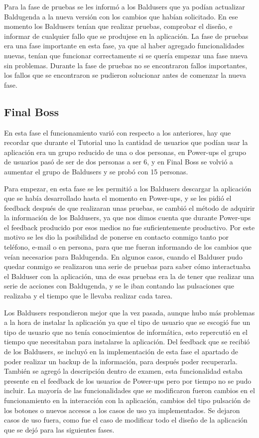 Para la fase de pruebas se les informó a los Baldusers que ya podían actualizar Baldugenda a la nueva versión con los cambios que habían solicitado. En ese momento los Baldusers tenían que realizar pruebas, comprobar el diseño, e informar de  cualquier fallo que se produjese en la aplicación. La fase de pruebas era una fase importante en esta fase, ya que al haber agregado funcionalidades nuevas, tenían que funcionar correctamente si se quería empezar una fase nueva sin problemas. Durante la fase de pruebas no se encontraron fallos importantes, los fallos que se encontraron se pudieron solucionar antes de comenzar la nueva fase.

\subsection{Final Boss}
\label{subsecc:final boss}

En esta fase el funcionamiento varió con respecto a los anteriores, hay que recordar que durante el Tutorial uno la cantidad de usuarios que podían usar la aplicación era un grupo reducido de una o dos personas, en Power-ups el grupo de usuarios pasó de ser de dos personas a ser 6, y en Final Boss se volvió a aumentar el grupo de Baldusers y se probó con 15 personas.

Para empezar, en esta fase se les permitió a los Baldusers descargar la aplicación que se había desarrollado hasta el momento en Power-ups, y se les pidió el feedback después de que realizaran unas pruebas, se cambió el método de adquirir la información de los Baldusers, ya que nos dimos cuenta que durante Power-ups el feedback producido por esos medios no fue suficientemente productivo. Por este motivo se les dio la posibilidad de ponerse en contacto conmigo tanto por teléfono, e-mail o en persona, para que me fueran informando de los cambios que veían necesarios para Baldugenda.
En algunos casos, cuando el Balduser pudo quedar conmigo se realizaron una serie de pruebas para saber cómo interactuaba el Balduser con la aplicación, una de esas pruebas era la de tener que realizar una serie de acciones con Baldugenda, y se le iban contando las pulsaciones que realizaba y el tiempo que le llevaba realizar cada tarea.

Los Baldusers respondieron mejor que la vez pasada, aunque hubo más problemas a la hora de instalar la aplicación ya que el tipo de usuario que se escogió fue un tipo de usuario que no tenía conocimientos de informática, esto repercutió en el tiempo que necesitaban para instalarse la aplicación. Del feedback que se recibió de los Baldusers, se incluyó en la implementación de esta fase el apartado de poder realizar un backup de la información, para después poder recuperarla. También se agregó la descripción dentro de examen, esta funcionalidad estaba presente en el feedback de los usuarios de Power-ups pero por tiempo no se pudo incluir. La mayoría de las funcionalidades que se modificaron fueron cambios en el funcionamiento en la interacción con la aplicación, cambios del tipo pulsación de los botones o nuevos accesos a los casos de uso ya implementados. Se dejaron casos de uso fuera, como fue el caso de modificar todo el diseño de la aplicación que se dejó para las siguientes fases.

